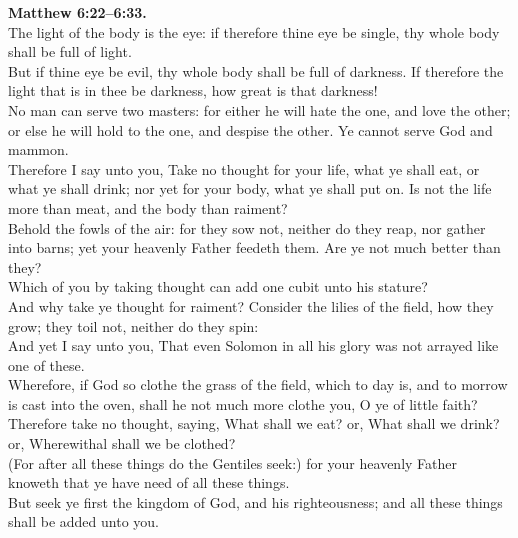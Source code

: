\documentclass[10pt]{article} %
\begin{document}
{\begin{minipage}[t]{0.45\textwidth}
\textbf{Matthew 6:22--6:33.}\\
The light of the body is the eye: if therefore thine eye be single, thy whole body shall be full of light.\\
But if thine eye be evil, thy whole body shall be full of darkness. If therefore the light that is in thee be darkness, how great is that darkness!\\
No man can serve two masters: for either he will hate the one, and love the other; or else he will hold to the one, and despise the other. Ye cannot serve God and mammon.\\
Therefore I say unto you, Take no thought for your life, what ye shall eat, or what ye shall drink; nor yet for your body, what ye shall put on. Is not the life more than meat, and the body than raiment?\\
Behold the fowls of the air: for they sow not, neither do they reap, nor gather into barns; yet your heavenly Father feedeth them. Are ye not much better than they?\\
Which of you by taking thought can add one cubit unto his stature?\\
And why take ye thought for raiment? Consider the lilies of the field, how they grow; they toil not, neither do they spin:\\
And yet I say unto you, That even Solomon in all his glory was not arrayed like one of these.\\
Wherefore, if God so clothe the grass of the field, which to day is, and to morrow is cast into the oven, shall he not much more clothe you, O ye of little faith?\\
Therefore take no thought, saying, What shall we eat? or, What shall we drink? or, Wherewithal shall we be clothed?\\
(For after all these things do the Gentiles seek:) for your heavenly Father knoweth that ye have need of all these things.\\
But seek ye first the kingdom of God, and his righteousness; and all these things shall be added unto you.\\

\end{minipage}}
\vspace*{\fill}
\newpage
\huge%
\vspace*{\fill}
\end{document}
